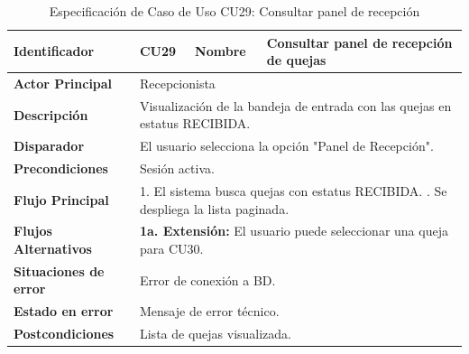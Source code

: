 \begingroup
\setlength{\parskip}{0pt}
\begin{longtable}{|p{3.5cm}|p{2cm}|p{2.5cm}|p{7cm}|}
\caption{Especificación de Caso de Uso CU29: Consultar panel de recepción}
\label{tab:cu29} \\
\hline
\textbf{Identificador} & CU29 & \textbf{Nombre} & Consultar panel de recepción de quejas \\ \hline
\textbf{Actor Principal} & \multicolumn{3}{p{11.5cm}|}{Recepcionista} \\ \hline
\textbf{Descripción} & \multicolumn{3}{p{11.5cm}|}{Visualización de la bandeja de entrada con las quejas en estatus RECIBIDA.} \\ \hline
\textbf{Disparador} & \multicolumn{3}{p{11.5cm}|}{El usuario selecciona la opción "Panel de Recepción".} \\ \hline
\textbf{Precondiciones} & \multicolumn{3}{p{11.5cm}|}{Sesión activa.} \\ \hline
\textbf{Flujo Principal} & \multicolumn{3}{p{11.5cm}|}{1. El sistema busca quejas con estatus RECIBIDA. \newline 2. Se despliega la lista paginada.} \\ \hline
\textbf{Flujos Alternativos} & \multicolumn{3}{p{11.5cm}|}{\textbf{1a. Extensión:} El usuario puede seleccionar una queja para CU30.} \\ \hline
\textbf{Situaciones de error} & \multicolumn{3}{p{11.5cm}|}{Error de conexión a BD.} \\ \hline
\textbf{Estado en error} & \multicolumn{3}{p{11.5cm}|}{Mensaje de error técnico.} \\ \hline
\textbf{Postcondiciones} & \multicolumn{3}{p{11.5cm}|}{Lista de quejas visualizada.} \\ \hline
\end{longtable}
\endgroup

\vspace{0.8cm}

